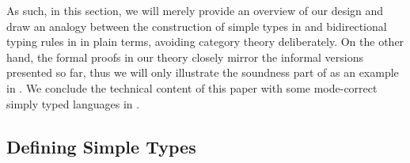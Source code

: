 \documentclass[BiSig.tex]{subfiles}
\begin{document}
As such, in this section, we will merely provide an overview of our design and draw an analogy between the construction of simple types in  and bidirectional typing rules in  in plain terms, avoiding category theory deliberately.
On the other hand, the formal proofs in our theory closely mirror the informal versions presented so far, thus we will only illustrate the soundness part of  as an example in . 
We conclude the technical content of this paper with some mode-correct simply typed languages in .

\subsection{Defining Simple Types}\label{subsec:formal-simple-types}
\end{document}
